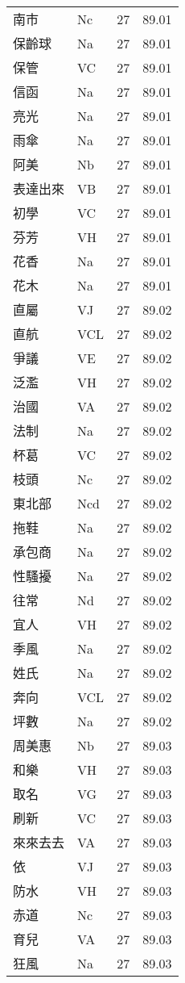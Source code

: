 \documentclass[twocolumn]{book}
\begin{document}
\begin{supertabular}{llrr}
南市 & Nc & 27 &  89.01\\
保齡球 & Na & 27 &  89.01\\
保管 & VC & 27 &  89.01\\
信函 & Na & 27 &  89.01\\
亮光 & Na & 27 &  89.01\\
雨傘 & Na & 27 &  89.01\\
阿美 & Nb & 27 &  89.01\\
表達出來 & VB & 27 &  89.01\\
初學 & VC & 27 &  89.01\\
芬芳 & VH & 27 &  89.01\\
花香 & Na & 27 &  89.01\\
花木 & Na & 27 &  89.01\\
直屬 & VJ & 27 &  89.02\\
直航 & VCL & 27 &  89.02\\
爭議 & VE & 27 &  89.02\\
泛濫 & VH & 27 &  89.02\\
治國 & VA & 27 &  89.02\\
法制 & Na & 27 &  89.02\\
杯葛 & VC & 27 &  89.02\\
枝頭 & Nc & 27 &  89.02\\
東北部 & Ncd & 27 &  89.02\\
拖鞋 & Na & 27 &  89.02\\
承包商 & Na & 27 &  89.02\\
性騷擾 & Na & 27 &  89.02\\
往常 & Nd & 27 &  89.02\\
宜人 & VH & 27 &  89.02\\
季風 & Na & 27 &  89.02\\
姓氏 & Na & 27 &  89.02\\
奔向 & VCL & 27 &  89.02\\
坪數 & Na & 27 &  89.02\\
周美惠 & Nb & 27 &  89.03\\
和樂 & VH & 27 &  89.03\\
取名 & VG & 27 &  89.03\\
刷新 & VC & 27 &  89.03\\
來來去去 & VA & 27 &  89.03\\
依 & VJ & 27 &  89.03\\
防水 & VH & 27 &  89.03\\
赤道 & Nc & 27 &  89.03\\
育兒 & VA & 27 &  89.03\\
狂風 & Na & 27 &  89.03\\

\end{supertabular}
\end{document}

